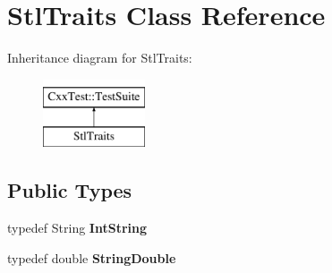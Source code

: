 \hypertarget{classStlTraits}{\section{Stl\-Traits Class Reference}
\label{classStlTraits}
}
Inheritance diagram for Stl\-Traits\-:\begin{figure}[H]
\begin{center}
\leavevmode
\includegraphics[height=2.000000cm]{classStlTraits}
\end{center}
\end{figure}
\subsection*{Public Types}
\begin{DoxyCompactItemize}
\item 
\hypertarget{classStlTraits_a005d8b64144f225aa7e586a061205358}{typedef String {\bfseries Int\-String}}\label{classStlTraits_a005d8b64144f225aa7e586a061205358}

\item 
\hypertarget{classStlTraits_a1eecab7584ff5365652939c1a4205b97}{typedef double {\bfseries String\-Double}}\label{classStlTraits_a1eecab7584ff5365652939c1a4205b97}

\end{DoxyCompactItemize}
